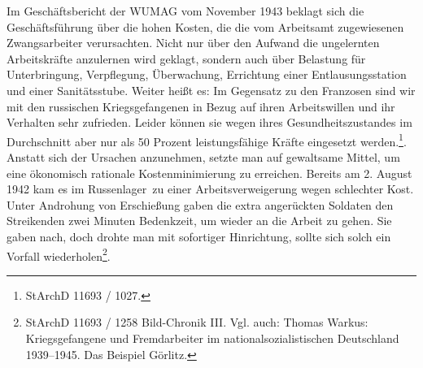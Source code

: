 \documentclass[a4paper,12pt,ngerman,
]{nisebook}
\begin{document}
\newline
Im Geschäftsbericht der WUMAG vom November 1943 beklagt sich die Geschäftsführung über die hohen Kosten, die die vom Arbeitsamt zugewiesenen Zwangsarbeiter verursachten. Nicht nur über den Aufwand die ungelernten Arbeitskräfte anzulernen wird geklagt, sondern auch über Belastung für Unterbringung, Verpflegung, Überwachung, Errichtung einer Entlausungsstation und einer Sanitätsstube. Weiter heißt es: \glqq Im Gegensatz zu den Franzosen sind wir mit den russischen Kriegsgefangenen in Bezug auf ihren Arbeitswillen und ihr Verhalten sehr zufrieden. Leider können sie wegen ihres Gesundheitszustandes im Durchschnitt aber nur als 50 Prozent leistungsfähige Kräfte eingesetzt werden.\grqq\footnote{StArchD 11693 / 1027.}. Anstatt sich der Ursachen anzunehmen, setzte man auf gewaltsame Mittel, um eine ökonomisch rationale Kostenminimierung zu erreichen.
Bereits am 2. August 1942 kam es im \glqq Russenlager\grqq~zu einer Arbeitsverweigerung wegen schlechter Kost. Unter Androhung von Erschießung gaben die extra angerückten Soldaten den Streikenden zwei Minuten Bedenkzeit, um wieder an die Arbeit zu gehen. Sie gaben nach, doch drohte man mit sofortiger Hinrichtung, sollte sich solch ein Vorfall wiederholen\footnote{StArchD 11693 / 1258 Bild-Chronik III. Vgl. auch: Thomas Warkus: Kriegsgefangene und Fremdarbeiter im nationalsozialistischen Deutschland 1939--1945. Das Beispiel Görlitz.}.
\end{document}
